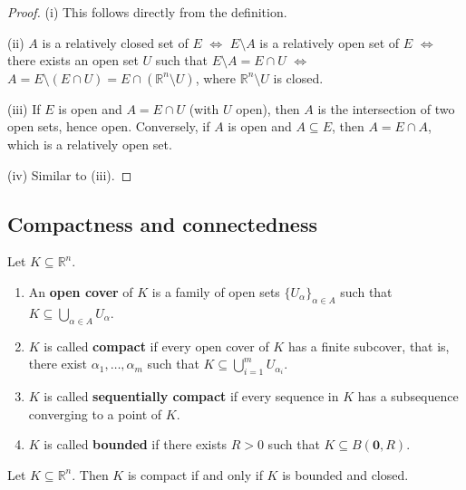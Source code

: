 \begin{proof}
(i) This follows directly from the definition.

(ii) $A$ is a relatively closed set of $E$ $\iff$ $E \setminus A$ is a relatively open set of $E$ $\iff$ there exists an open set $U$ such that $E \setminus A = E \cap U$ $\iff$ $A = E \setminus (E \cap U) = E \cap (\mathbb{R}^n \setminus U)$, where $\mathbb{R}^n \setminus U$ is closed.

(iii) If $E$ is open and $A = E \cap U$ (with $U$ open), then $A$ is the intersection of two open sets, hence open. Conversely, if $A$ is open and $A \subseteq E$, then $A = E \cap A$, which is a relatively open set.

(iv) Similar to (iii).
\end{proof}

\subsection{Compactness and connectedness}

\begin{definition}\label{def:compactness}
Let $K \subseteq \mathbb{R}^n$.
\begin{enumerate}[label=(\roman*)]
    \item An \textbf{open cover} of $K$ is a family of open sets $\{U_\alpha\}_{\alpha \in A}$ such that $K \subseteq \bigcup_{\alpha \in A} U_\alpha$.
    \item $K$ is called \textbf{compact} if every open cover of $K$ has a finite subcover, that is, there exist $\alpha_1, \dots, \alpha_m$ such that $K \subseteq \bigcup_{i=1}^{m} U_{\alpha_i}$.
    \item $K$ is called \textbf{sequentially compact} if every sequence in $K$ has a subsequence converging to a point of $K$.
    \item $K$ is called \textbf{bounded} if there exists $R > 0$ such that $K \subseteq B(\mathbf{0}, R)$.
\end{enumerate}
\end{definition}

\begin{theorem}\label{thm:heine_borel}
Let $K \subseteq \mathbb{R}^n$. Then $K$ is compact if and only if $K$ is bounded and closed.
\end{theorem}

